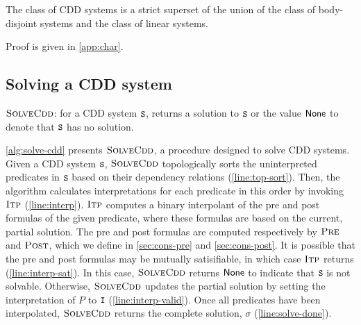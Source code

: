 \begin{thm}
\label{thm:cdd-contains}
  The class of CDD systems is a strict superset of the union of the
  class of body-disjoint systems and the class of linear systems.
\end{thm}
%
Proof is given in \autoref{app:char}.

\subsection{Solving a CDD system}
\label{sec:solve-cdd}

\begin{algorithm}[t]
  \caption{$\textsc{SolveCdd}$: for a CDD system $\cc{S}$, returns a
    solution to $\cc{S}$ or the value $\mathsf{None}$ to denote that
    $\cc{S}$ has no solution.}
  \label{alg:solve-cdd}
\end{algorithm}


\autoref{alg:solve-cdd} presents $\textsc{SolveCdd}$, a procedure designed to solve
CDD systems.
%
Given a CDD system $\cc{S}$, $\textsc{SolveCdd}$ topologically sorts the uninterpreted
predicates in $\cc{S}$ based on their dependency relations
(\autoref{line:top-sort}).
%
Then, the algorithm calculates interpretations for each predicate in this order
by invoking $\textsc{Itp}$ (\autoref{line:interp}).
%
$\textsc{Itp}$ computes a binary interpolant of the pre and post formulas of the
given predicate, where these formulas are based on the current, partial
solution.
%
The pre and post formulas are computed respectively by $\textsc{Pre}$ and
$\textsc{Post}$, which we define in \autoref{sec:cons-pre} and \autoref{sec:cons-post}.
%
It is possible that the pre and post formulas may be mutually
satisifiable, in which case $\textsc{Itp}$ returns 
(\autoref{line:interp-sat}). In this case, $\textsc{SolveCdd}$ returns
$\mathsf{None}$ to indicate that $\cc{S}$ is not solvable.
%
Otherwise, $\textsc{SolveCdd}$ updates the partial solution by setting the
interpretation of $P$ to $\cc{I}$ (\autoref{line:interp-valid}).
%
Once all predicates have been interpolated, $\textsc{SolveCdd}$ returns the complete
solution, $\sigma$ (\autoref{line:solve-done}).

